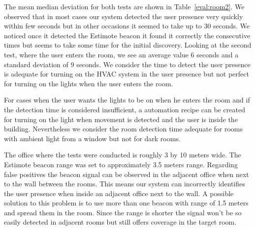 The mean median deviation for both tests are shown in Table~\ref{eval:room2}. We observed that in most cases our system detected the user presence very quickly within few seconds but in other occasions it seemed to take up to 30 seconds. We noticed once it detected the Estimote beacon it found it correctly the consecutive times but seems to take some time for the initial discovery. Looking at the second test, where the user enters the room, we see an average value 6 seconds and a standard deviation of 9 seconds. We consider the time to detect the user presence is adequate for turning on the \ac{HVAC} system in the user presence but not perfect for turning on the lights when the user enters the room.

For cases when the user wants the lights to be on when he enters the room and if the detection time is considered insufficient, a automation recipe can be created for turning on the light when movement is detected and the user is inside the building. Nevertheless we consider the room detection time adequate for rooms with ambient light from a window but not for dark rooms.

The office where the tests were conducted is roughly 3 by 10 meters wide. The Estimote beacon range was set to approximately 3.5 meters range. Regarding false positives the beacon signal can be observed in the adjacent office when next to the wall between the rooms. This means our system can incorrectly identifies the user presence when inside an adjacent office next to the wall. A possible solution to this problem is to use more than one beacon with range of 1.5 meters and spread them in the room. Since the range is shorter the signal won't be so easily detected in adjacent rooms but still offers coverage in the target room.


